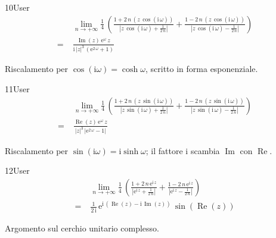\begin{espr}{10}{User}{}
\begin{align*}
& \lim_{n \to +\infty} \frac{1}{4}\, \left(\frac{1 + 2\, n\, \left(z\, \cos\!\left(\mathrm{i}\, \omega\right)\right)}{\left|z\, \cos\!\left(\mathrm{i}\, \omega\right) + \frac{1}{2\, n}\right|} + \frac{1 - 2\, n\, \left(z\, \cos\!\left(\mathrm{i}\, \omega\right)\right)}{\left|z\, \cos\!\left(\mathrm{i}\, \omega\right) - \frac{1}{2\, n}\right|}\right) \\
=\;& \frac{\operatorname{Im}\!\left(z\right)\, \mathrm{e}^{\omega}\, z}{\mathrm{i}\, \left|z\right|^{3}\, \left(\mathrm{e}^{2\, \omega} + 1\right)}
\end{align*}
\end{espr}
Riscalamento per $\cos(\mathrm{i}\omega)=\cosh\omega$, scritto in forma esponenziale.

\begin{espr}{11}{User}{}
\begin{align*}
& \lim_{n \to +\infty} \frac{1}{4}\, \left(\frac{1 + 2\, n\, \left(z\, \sin\!\left(\mathrm{i}\, \omega\right)\right)}{\left|z\, \sin\!\left(\mathrm{i}\, \omega\right) + \frac{1}{2\, n}\right|} + \frac{1 - 2\, n\, \left(z\, \sin\!\left(\mathrm{i}\, \omega\right)\right)}{\left|z\, \sin\!\left(\mathrm{i}\, \omega\right) - \frac{1}{2\, n}\right|}\right) \\
=\;& \frac{\operatorname{Re}\!\left(z\right)\, \mathrm{e}^{\omega}\, z}{\left|z\right|^{3}\, \left|\mathrm{e}^{2\, \omega} - 1\right|}
\end{align*}
\end{espr}
Riscalamento per $\sin(\mathrm{i}\omega)=\mathrm{i}\sinh\omega$; il fattore $\mathrm{i}$ scambia $\operatorname{Im}$ con $\operatorname{Re}$.

\begin{espr}{12}{User}{\verificata}
\begin{align*}
& \lim_{n \to +\infty} \frac{1}{4}\, \left(\frac{1 + 2\, n\, \mathrm{e}^{\mathrm{i}\, z}}{\left|\mathrm{e}^{\mathrm{i}\, z} + \frac{1}{2\, n}\right|} + \frac{1 - 2\, n\, \mathrm{e}^{\mathrm{i}\, z}}{\left|\mathrm{e}^{\mathrm{i}\, z} - \frac{1}{2\, n}\right|}\right) \\
=\;& \frac{1}{2\, \mathrm{i}}\, \mathrm{e}^{\mathrm{i}\, \left(\operatorname{Re}\!\left(z\right) - \mathrm{i}\, \operatorname{Im}\!\left(z\right)\right)}\, \sin\!\left(\operatorname{Re}\!\left(z\right)\right)
\end{align*}
\end{espr}
Argomento sul cerchio unitario complesso.


